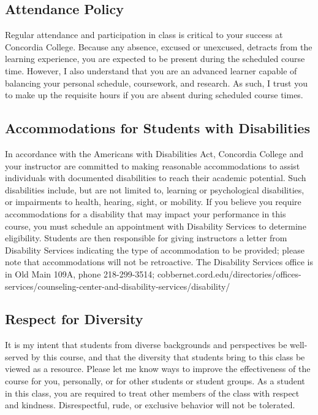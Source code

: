 \documentclass{tufte-handout}
\begin{document}
\begin{fullwidth}

\subsection{Attendance Policy}

Regular attendance and participation in class is critical to your success at Concordia College. Because any absence, excused or unexcused, detracts from the learning experience, you are expected to be present during the scheduled course time. However, I also understand that you are an advanced learner capable of balancing your personal schedule, coursework, and research. As such, I trust you to make up the requisite  hours if you are absent during scheduled course times. 


\subsection{Accommodations for Students with Disabilities}

In accordance with the Americans with Disabilities Act, Concordia College and your instructor are committed to making reasonable accommodations to assist individuals with documented disabilities to reach their academic potential. Such disabilities include, but are not limited to, learning or psychological disabilities, or impairments to health, hearing, sight, or mobility. If you believe you require accommodations for a disability that may impact your performance in this course, you must schedule an appointment with Disability Services to determine eligibility. Students are then responsible for giving instructors a letter from Disability Services indicating the type of accommodation to be provided; please note that accommodations will not be retroactive. The Disability Services office is in Old Main 109A, phone 218-299-3514; cobbernet.cord.edu/directories/offices-services/counseling-center-and-disability-services/disability/


\subsection{Respect for Diversity}

It is my intent that students from diverse backgrounds and perspectives be well-served by this course, and that the diversity that students bring to this class be viewed as a resource. Please let me know ways to improve the effectiveness of the course for you, personally, or for other students or student groups. As a student in this class, you are required to treat other members of the class with respect and kindness. Disrespectful, rude, or exclusive behavior will not be tolerated.


\end{fullwidth}
\end{document}
